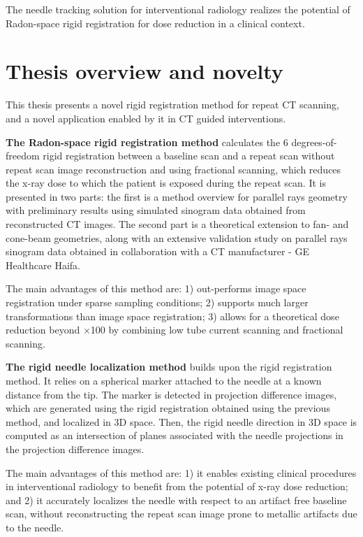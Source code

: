 The needle tracking solution for interventional radiology realizes the potential of Radon-space rigid registration for dose reduction in a clinical context.

\section{Thesis overview and novelty}

This thesis presents a novel rigid registration method for repeat CT scanning, and a novel application enabled by it in CT guided interventions.

\textbf{The Radon-space rigid registration method} calculates the 6 degrees-of-freedom rigid registration between a baseline scan and a repeat scan without repeat scan image reconstruction and using fractional scanning, which reduces the x-ray dose to which the patient is exposed during the repeat scan.
It is presented in two parts: the first is a method overview for parallel rays geometry with preliminary results using simulated sinogram data obtained from reconstructed CT images. The second part is a theoretical extension to fan- and cone-beam geometries, along with an extensive validation study on parallel rays sinogram data obtained in collaboration with a CT manufacturer - GE Healthcare Haifa.
 
The main advantages of this method are: 
1) out-performs image space registration under sparse sampling  conditions;
2) supports much larger transformations than image space registration; 
3) allows for a theoretical dose reduction beyond $\times$100 by combining low tube current scanning and fractional scanning.

\textbf{The rigid needle localization method} builds upon the rigid registration method.
It relies on a spherical marker attached to the needle at a known distance from the tip. The marker is detected in projection difference images, which are generated using the rigid registration obtained using the previous method, and localized in 3D space. Then, the rigid needle direction in 3D space is computed as an intersection of planes associated with the needle projections in the projection difference images.

The main advantages of this method are: 1) it enables existing clinical procedures in interventional radiology to benefit from the potential of x-ray dose reduction; and 2) it accurately localizes the needle with respect to an artifact free baseline scan, without reconstructing the repeat scan image prone to metallic artifacts due to the needle.

